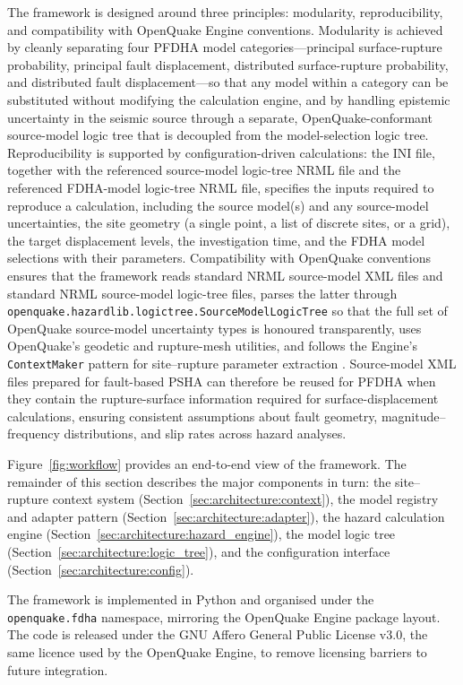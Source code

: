 The framework is designed around three principles: modularity, reproducibility, and compatibility with OpenQuake Engine conventions. Modularity is achieved by cleanly separating four PFDHA model categories---principal surface-rupture probability, principal fault displacement, distributed surface-rupture probability, and distributed fault displacement---so that any model within a category can be substituted without modifying the calculation engine, and by handling epistemic uncertainty in the seismic source through a separate, OpenQuake-conformant source-model logic tree that is decoupled from the model-selection logic tree. Reproducibility is supported by configuration-driven calculations: the INI file, together with the referenced source-model logic-tree NRML file and the referenced FDHA-model logic-tree NRML file, specifies the inputs required to reproduce a calculation, including the source model(s) and any source-model uncertainties, the site geometry (a single point, a list of discrete sites, or a grid), the target displacement levels, the investigation time, and the FDHA model selections with their parameters. Compatibility with OpenQuake conventions ensures that the framework reads standard NRML source-model XML files and standard NRML source-model logic-tree files, parses the latter through \texttt{openquake.hazardlib.logictree.SourceModelLogicTree} so that the full set of OpenQuake source-model uncertainty types is honoured transparently, uses OpenQuake's geodetic and rupture-mesh utilities, and follows the Engine's \texttt{ContextMaker} pattern for site--rupture parameter extraction \citep{Pagani2014}. Source-model XML files prepared for fault-based PSHA can therefore be reused for PFDHA when they contain the rupture-surface information required for surface-displacement calculations, ensuring consistent assumptions about fault geometry, magnitude--frequency distributions, and slip rates across hazard analyses.


Figure~\ref{fig:workflow} provides an end-to-end view of the framework. The remainder of this section describes the major components in turn: the site--rupture context system (Section~\ref{sec:architecture:context}), the model registry and adapter pattern (Section~\ref{sec:architecture:adapter}), the hazard calculation engine (Section~\ref{sec:architecture:hazard_engine}), the model logic tree (Section~\ref{sec:architecture:logic_tree}), and the configuration interface (Section~\ref{sec:architecture:config}).

The framework is implemented in Python and organised under the \texttt{openquake.fdha} namespace, mirroring the OpenQuake Engine package layout. The code is released under the GNU Affero General Public License v3.0, the same licence used by the OpenQuake Engine, to remove licensing barriers to future integration.


